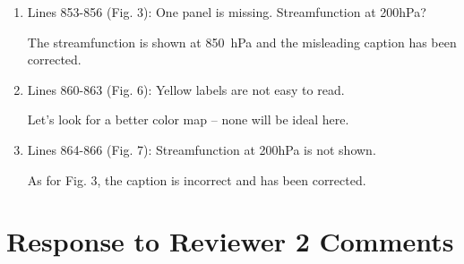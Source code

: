 \documentclass{article}
\newenvironment{answer}{\begin{mdframed}}{\end{mdframed}}
\begin{document}
\begin{enumerate}
	\item Lines 853-856 (Fig. 3): One panel is missing. Streamfunction at 200hPa?
	\begin{answer}
		The streamfunction is shown at \SI{850}{\hecto\pascal} and the misleading caption has been corrected.
	\end{answer}
	\item	Lines 860-863 (Fig. 6): Yellow labels are not easy to read.
	\begin{answer}
		Let's look for a better color map -- none will be ideal here.
	\end{answer}
	\item	Lines 864-866 (Fig. 7): Streamfunction at 200hPa is not shown.
	\begin{answer}
		As for Fig. 3, the caption is incorrect and has been corrected.
	\end{answer}
\end{enumerate}

\section{Response to Reviewer 2 Comments}
\end{document}
